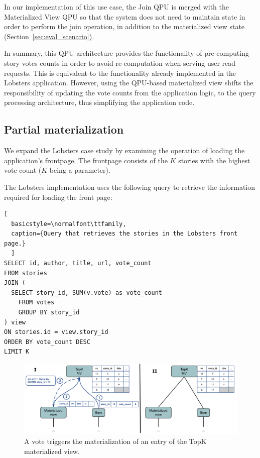 In our implementation of this use case,
the Join QPU is merged with the Materialized View QPU so that the system does not need to maintain state
in order to perform the join operation, in addition to the materialized view state (Section~\ref{sec:eval_scenario}).

In summary,
this QPU architecture provides the functionality of pre-computing story votes counts in order to avoid re-computation
when serving user read requests.
This is equivalent to the functionality already implemented in the Lobsters application.
However, using the QPU-based materialized view shifts the responsibility of updating the vote counts from the application logic,
to the query processing architecture, thus simplifying the application code.


\subsection{Partial materialization}

We expand the Lobsters case study by examining the operation of loading the application's frontpage.
The frontpage consists of the $K$ stories with the highest vote count ($K$ being a parameter).

The Lobsters implementation uses the following query to retrieve the information required for loading the front page:

\begin{lstlisting}[
  basicstyle=\normalfont\ttfamily,
  caption={Query that retrieves the stories in the Lobsters front page.}
  ]
SELECT id, author, title, url, vote_count
FROM stories
JOIN (
  SELECT story_id, SUM(v.vote) as vote_count
	FROM votes
	GROUP BY story_id
) view
ON stories.id = view.story_id
ORDER BY vote_count DESC
LIMIT K
\end{lstlisting}

\begin{figure}[t]
  \centering
    \includegraphics[scale=0.4]{./figures/case_studies/lobsters_architecture_materialization.pdf}
  \caption{A vote triggers the materialization of an entry of the TopK materialized view.}
  \label{fig:lobsters_architecture_materialization}
\end{figure}

